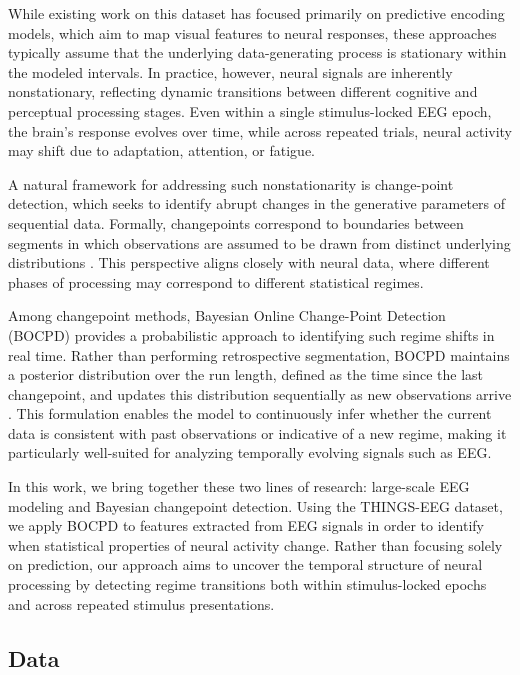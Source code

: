 \documentclass[11pt,letterpaper]{article}
\begin{document}
While existing work on this dataset has focused primarily on predictive encoding models, which aim to map visual features to neural responses, these approaches typically assume that the underlying data-generating process is stationary within the modeled intervals. In practice, however, neural signals are inherently nonstationary, reflecting dynamic transitions between different cognitive and perceptual processing stages. Even within a single stimulus-locked EEG epoch, the brain’s response evolves over time, while across repeated trials, neural activity may shift due to adaptation, attention, or fatigue.

A natural framework for addressing such nonstationarity is change-point detection, which seeks to identify abrupt changes in the generative parameters of sequential data. Formally, changepoints correspond to boundaries between segments in which observations are assumed to be drawn from distinct underlying distributions \citep{gifford2022things_eeg}. This perspective aligns closely with neural data, where different phases of processing may correspond to different statistical regimes.

Among changepoint methods, Bayesian Online Change-Point Detection (BOCPD) provides a probabilistic approach to identifying such regime shifts in real time. Rather than performing retrospective segmentation, BOCPD maintains a posterior distribution over the run length, defined as the time since the last changepoint, and updates this distribution sequentially as new observations arrive \citep{gifford2022things_eeg}. This formulation enables the model to continuously infer whether the current data is consistent with past observations or indicative of a new regime, making it particularly well-suited for analyzing temporally evolving signals such as EEG.

In this work, we bring together these two lines of research: large-scale EEG modeling and Bayesian changepoint detection. Using the THINGS-EEG dataset, we apply BOCPD to features extracted from EEG signals in order to identify when statistical properties of neural activity change. Rather than focusing solely on prediction, our approach aims to uncover the temporal structure of neural processing by detecting regime transitions both within stimulus-locked epochs and across repeated stimulus presentations.

\subsection{Data}
\end{document}
